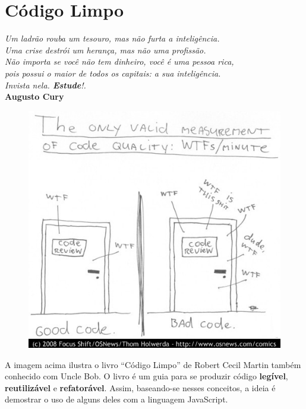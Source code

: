\chapter{Código Limpo}\label{cap:cap3}

\begin{flushright}
	\textit{
		Um ladrão rouba um tesouro, mas não furta a inteligência. \\
		Uma crise destrói um herança, mas não uma profissão. \\ Não importa se você não tem dinheiro, você é uma pessoa rica, \\ pois possui o maior de todos os capitais: a sua inteligência. \\ Invista nela. \textbf{Estude}!.
	} \\
	
	\textbf{Augusto Cury}
\end{flushright}

\begin{figure}[H]
	\centering
	\includegraphics[scale=3.5]{imagens/687474703a2f2f7777772e6f736e6577732e636f6d2f696d616765732f636f6d6963732f7774666d2e6a7067.jpg}
\end{figure}

A imagem acima ilustra o livro ``Código Limpo'' de Robert Cecil Martin também conhecido com Uncle Bob. O livro é um guia para se produzir código \textbf{legível}, \textbf{reutilizável} e \textbf{refatorável}. Assim, baseando-se nesses conceitos, a ideia é demostrar o uso de alguns deles com a linguagem JavaScript.


